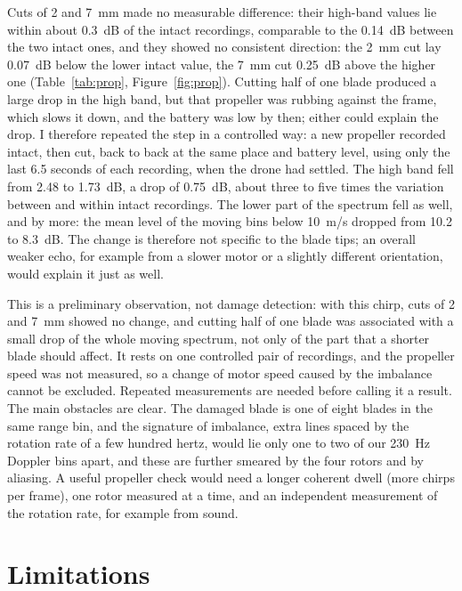 \documentclass[11pt,a4paper]{article}
\begin{document}
Cuts of 2 and \SI{7}{mm} made no measurable difference: their high-band values lie within about \SI{0.3}{dB} of the intact recordings, comparable to the \SI{0.14}{dB} between the two intact ones, and they showed no consistent direction: the \SI{2}{mm} cut lay \SI{0.07}{dB} below the lower intact value, the \SI{7}{mm} cut \SI{0.25}{dB} above the higher one (Table~\ref{tab:prop}, Figure~\ref{fig:prop}). Cutting half of one blade produced a large drop in the high band, but that propeller was rubbing against the frame, which slows it down, and the battery was low by then; either could explain the drop. I therefore repeated the step in a controlled way: a new propeller recorded intact, then cut, back to back at the same place and battery level, using only the last 6.5 seconds of each recording, when the drone had settled. The high band fell from 2.48 to \SI{1.73}{dB}, a drop of \SI{0.75}{dB}, about three to five times the variation between and within intact recordings. The lower part of the spectrum fell as well, and by more: the mean level of the moving bins below \SI{10}{m/s} dropped from 10.2 to \SI{8.3}{dB}. The change is therefore not specific to the blade tips; an overall weaker echo, for example from a slower motor or a slightly different orientation, would explain it just as well.

This is a preliminary observation, not damage detection: with this chirp, cuts of 2 and \SI{7}{mm} showed no change, and cutting half of one blade was associated with a small drop of the whole moving spectrum, not only of the part that a shorter blade should affect. It rests on one controlled pair of recordings, and the propeller speed was not measured, so a change of motor speed caused by the imbalance cannot be excluded. Repeated measurements are needed before calling it a result. The main obstacles are clear. The damaged blade is one of eight blades in the same range bin, and the signature of imbalance, extra lines spaced by the rotation rate of a few hundred hertz, would lie only one to two of our \SI{230}{Hz} Doppler bins apart, and these are further smeared by the four rotors and by aliasing. A useful propeller check would need a longer coherent dwell (more chirps per frame), one rotor measured at a time, and an independent measurement of the rotation rate, for example from sound.

\section{Limitations}\label{sec:limits}
\end{document}
